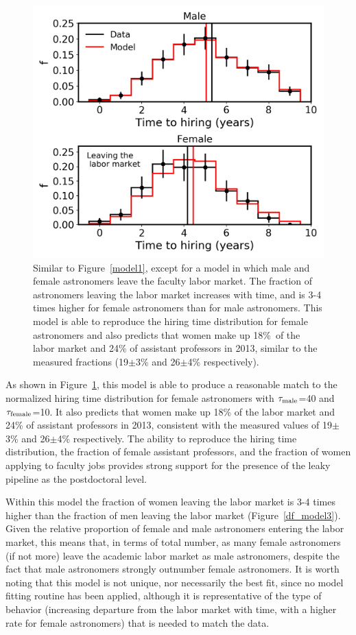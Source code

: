 \documentclass[modern]{aastex62}
\begin{document}
\begin{figure}[!hbt]
\center
\includegraphics[scale=.6]{model3.png}
\caption{Similar to Figure~\ref{model1}, except for a model in which male and female astronomers leave the faculty labor market. The fraction of astronomers leaving the labor market increases with time, and is 3-4 times higher for female astronomers than for male astronomers. This model is able to reproduce the hiring time distribution for female astronomers and also predicts that women make up 18\%\ of the labor market and 24\% of assistant professors in 2013, similar to the measured fractions (19$\pm$3\% and 26$\pm$4\% respectively).  \label{model3}}
\end{figure}

As shown in Figure~\ref{model3}, this model is able to produce a reasonable match to the normalized hiring time distribution for female astronomers with $\tau_{\rm male}$=40 and $\tau_{\rm female}$=10. It also predicts that women make up 18\% of the labor market and 24\% of assistant professors in 2013, consistent with the measured values of 19$\pm$3\% \citep{tho15} and 26$\pm$4\% \citep{hug14} respectively. The ability to reproduce the hiring time distribution, the fraction of female assistant professors, and the fraction of women applying to faculty jobs provides strong support for the presence of the leaky pipeline as the postdoctoral level. 

Within this model the fraction of women leaving the labor market is 3-4 times higher than the fraction of men leaving the labor market (Figure~\ref{df_model3}). Given the relative proportion of female and male astronomers entering the labor market, this means that, in terms of total number, as many female astronomers (if not more) leave the academic labor market as male astronomers, despite the fact that male astronomers strongly outnumber female astronomers. It is worth noting that this model is not unique, nor necessarily the best fit, since no model fitting routine has been applied, although it is representative of the type of behavior (increasing departure from the labor market with time, with a higher rate for female astronomers) that is needed to match the data. 
\end{document}
